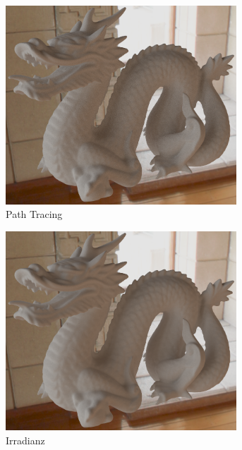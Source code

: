		\begin{figure}[h]
			\begin{subfigure}[t]{0.33\textwidth}
				\center
				\includegraphics[width=0.95\textwidth]{pic/irr_est-ra-dragon2-ref.png}
				\caption{Path Tracing}
			\end{subfigure}
			\begin{subfigure}[t]{0.33\textwidth}
				\center
				\includegraphics[width=0.95\textwidth]{pic/irr_est-ra-dragon2-irr.png}
				\caption{Irradianz}
			\end{subfigure}
			\begin{subfigure}[t]{0.33\textwidth}

\end{subfigure}
\end{figure}
